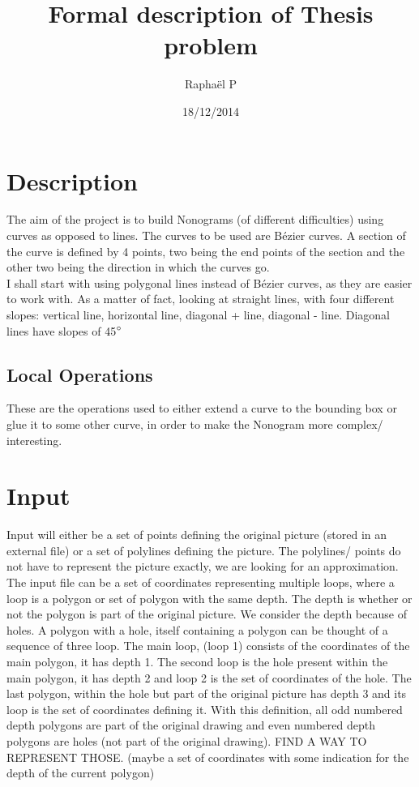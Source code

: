 \documentclass{article}
\title{Formal description of Thesis problem}
\author{Raphaël P}
\date{18/12/2014}
\begin{document}
\maketitle

\section{Description}

The aim of the project is to build Nonograms (of different difficulties) using curves as opposed to lines. The curves to be used are Bézier curves. A section of the curve is defined by 4 points, two being the end points of the section and the other two being the direction in which the curves go.\\

I shall start with using polygonal lines instead of Bézier curves, as they are easier to work with. As a matter of fact, looking at straight lines, with four different slopes: vertical line, horizontal line, diagonal + line, diagonal - line. Diagonal lines have slopes of 45$\degree$ 

\subsection[]{Local Operations}
These are the operations used to either extend a curve to the bounding box or glue it to some other curve, in order to make the Nonogram more complex/ interesting.

\section{Input}

Input will either be a set of points defining the original picture (stored in an external file) or a set of polylines defining the picture. The polylines/ points do not have to represent the picture exactly, we are looking for an approximation. \\


The input file can be a set of coordinates representing multiple loops, where a loop is a polygon or set of polygon with the same depth. The depth is whether or not the polygon is part of the original picture. We consider the depth because of holes. A polygon with a hole, itself containing a polygon can be thought of a sequence of three loop. The main loop, (loop 1) consists of the coordinates of the main polygon, it has depth 1. The second loop is the hole present within the main polygon, it has depth 2 and loop 2 is the set of coordinates of the hole. The last polygon, within the hole but part of the original picture has depth 3 and its loop is the set of coordinates defining it. With this definition, all odd numbered depth polygons are part of the original drawing and even numbered depth polygons are holes (not part of the original drawing). FIND A WAY TO REPRESENT THOSE. (maybe a set of coordinates with some indication for the depth of the current polygon)\\
\end{document}
